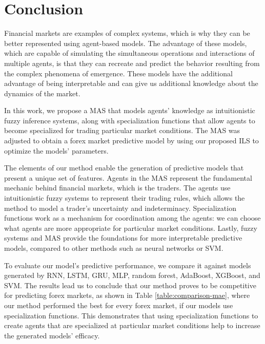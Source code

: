 \documentclass{ieeeaccess}
\begin{document}
\section{Conclusion}
\label{section:conclusion}


Financial markets are examples of complex systems, which is why they
can be better represented using agent-based models. The advantage of these models, which are capable of simulating the
simultaneous operations and interactions of multiple agents, is that they can
recreate and predict the behavior resulting from the complex phenomena of
emergence. These models have the additional advantage of being interpretable and
can give us additional knowledge about the dynamics of the market.

In this work, we propose a MAS that models agents' knowledge as
intuitionistic fuzzy inference systems, along with specialization
functions that allow agents to become specialized for trading
particular market conditions. The MAS was adjusted to obtain a forex
market predictive model by using our proposed ILS to optimize the
models' parameters.

The elements of our method enable the generation of predictive models
that present a unique set of features. Agents in the MAS represent the
fundamental mechanic behind financial markets, which is the
traders. The agents use intuitionistic fuzzy systems to represent
their trading rules, which allows the method to model a trader's
uncertainty and indeterminacy. Specialization functions work as a
mechanism for coordination among the agents: we can choose what agents
are more appropriate for particular market conditions. Lastly, fuzzy
systems and MAS provide the foundations for more interpretable
predictive models, compared to other methods such as neural networks
or SVM.

To evaluate our model's predictive performance, we compare it against
models generated by RNN, LSTM, GRU, MLP, random forest, AdaBoost,
XGBoost, and SVM. The results lead us to conclude that our method
proves to be competitive for predicting forex markets, as shown in
Table \ref{table:comparison-mae}, where our method performed the best
for every forex market, if our models use specialization
functions. This demonstrates that using specialization functions to
create agents that are specialized at particular market conditions
help to increase the generated models' efficacy.
\end{document}
